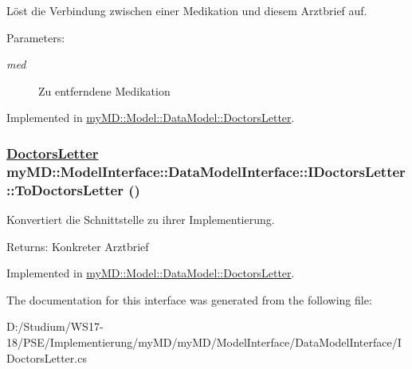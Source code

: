 L\"{o}st die Verbindung zwischen einer Medikation und diesem Arztbrief auf. 

\begin{Desc}
\item[Parameters:]
\begin{description}
\item[{\em med}]Zu entferndene Medikation\end{description}
\end{Desc}


Implemented in \hyperlink{classmy_m_d_1_1_model_1_1_data_model_1_1_doctors_letter_21bff2bea1b5f08bc7e79dd65b9ccf16}{my\-MD::Model::Data\-Model::Doctors\-Letter}.\hypertarget{interfacemy_m_d_1_1_model_interface_1_1_data_model_interface_1_1_i_doctors_letter_a52c06afbc0038d351f09b083e586b2e}{
\subsubsection[ToDoctorsLetter]{\setlength{\rightskip}{0pt plus 5cm}\hyperlink{classmy_m_d_1_1_model_1_1_data_model_1_1_doctors_letter}{Doctors\-Letter} my\-MD::Model\-Interface::Data\-Model\-Interface::IDoctors\-Letter::To\-Doctors\-Letter ()}}
\label{db/d8c/interfacemy_m_d_1_1_model_interface_1_1_data_model_interface_1_1_i_doctors_letter_a52c06afbc0038d351f09b083e586b2e}


Konvertiert die Schnittstelle zu ihrer Implementierung. 

\begin{Desc}
\item[Returns:]Konkreter Arztbrief\end{Desc}


Implemented in \hyperlink{classmy_m_d_1_1_model_1_1_data_model_1_1_doctors_letter_a52c06afbc0038d351f09b083e586b2e}{my\-MD::Model::Data\-Model::Doctors\-Letter}.

The documentation for this interface was generated from the following file:\begin{CompactItemize}
\item 
D:/Studium/WS17-18/PSE/Implementierung/my\-MD/my\-MD/Model\-Interface/Data\-Model\-Interface/IDoctors\-Letter.cs\end{CompactItemize}
